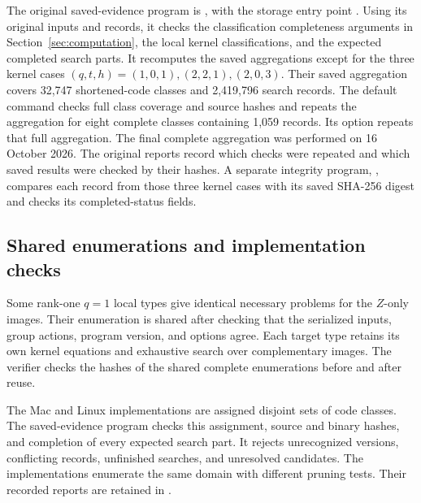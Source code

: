 The original saved-evidence program is
,
with the storage entry point .
Using its original inputs and records, it checks the classification
completeness arguments in Section~\ref{sec:computation}, the local kernel
classifications, and the expected completed search parts. It recomputes
the saved aggregations except for the three kernel cases
\((q,t,h)=(1,0,1),(2,2,1),(2,0,3)\).
Their saved aggregation covers 32,747 shortened-code classes and 2,419,796
search records. The default command checks full class coverage and source
hashes and repeats the aggregation for eight complete classes containing
1,059 records. Its  option repeats that full aggregation.
The final complete aggregation was performed on 16 October 2026.
The original reports record which checks were repeated and which saved
results were checked by their hashes. A separate integrity program,
, compares each record from
those three kernel cases with its saved SHA-256 digest and checks its
completed-status fields.

\subsection{Shared enumerations and implementation checks}

Some rank-one \(q=1\) local types give identical necessary problems for
the \(Z\)-only images. Their enumeration is shared after checking that
the serialized inputs, group actions, program version, and options agree.
Each target type retains its own kernel equations and exhaustive search
over complementary images. The verifier checks the hashes of the shared
complete enumerations before and after reuse.

The Mac and Linux implementations are assigned disjoint sets of code
classes. The saved-evidence program checks this assignment, source and
binary hashes, and completion of every expected search part. It rejects
unrecognized versions, conflicting records, unfinished searches, and
unresolved candidates. The implementations enumerate the same domain
with different pruning tests. Their recorded reports are retained in
.
